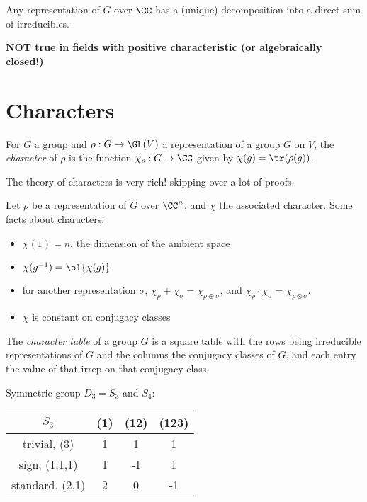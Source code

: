 \documentclass[12pt]{article}
\begin{document}
\begin{theorem*}
  Any representation of $G$ over $\CC$ has a (unique) decomposition into a
  direct sum of irreducibles. 

  \noindent\textbf{NOT true in fields with positive characteristic (or
  algebraically closed!)}
\end{theorem*}

\section{Characters}
\begin{definition*}
  For $G$ a group and $\rho : G \to \GL(V)$ a representation of a group $G$ on
  $V$, the \emph{character} of $\rho$ is the function $\chi_\rho : G \to \CC$
  given by $\chi(g) = \tr(\rho(g))$.  
\end{definition*} 
The theory of characters is very rich! skipping over a lot of proofs.

Let $\rho$ be a representation of $G$ over $\CC^n$, and $\chi$ the associated
character. Some facts about characters: 
\begin{itemize}
  \item $\chi(1) = n$, the dimension of the ambient space
  \item $\chi(g^{-1}) = \ol{\chi(g)}$
  \item for another representation $\sigma$, $\chi_\rho + \chi_\sigma =
    \chi_{\rho \oplus \sigma}$, and $\chi_\rho \cdot \chi_{\sigma} =
    \chi_{\rho\otimes \sigma}$. 
  \item $\chi$ is constant on conjugacy classes
\end{itemize}

\begin{definition*}
  The \emph{character table} of a group $G$ is a square table with the rows
  being irreducible representations of $G$ and the columns the conjugacy classes
  of $G$, and each entry the value of that irrep on that conjugacy class.  
\end{definition*}

\begin{example}
Symmetric group $D_3 = S_3$ and $S_4$:  
\begin{center}
\begin{tabular}{c|ccc}
    $S_3$ & (1) & (12) & (123) \\ \hline 
    trivial, (3) & 1 & 1 & 1 \\ 
    sign, (1,1,1) & 1 & -1 & 1 \\ 
    standard, (2,1) & 2 & 0 & -1 \\ 
  \end{tabular}
\end{center}  
\end{example}
\end{document}
